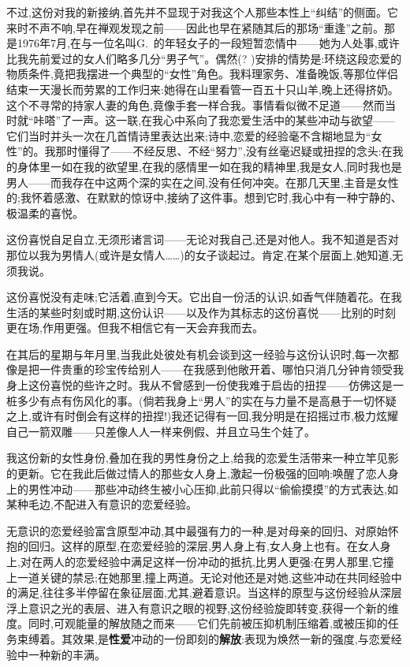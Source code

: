 不过,这份对我的新接纳,首先并不显现于对我这个人那些本性上“纠结”的侧面。它来时不声不响,早在禅观发现之前——因此也早在紧随其后的那场“重逢”之前。那是1976年7月,在与一位名叫G.~的年轻女子的一段短暂恋情中——她为人处事,或许比我先前爱过的女人们略多几分“男子气”。偶然(? )安排的情势是:环绕这段恋爱的物质条件,竟把我摆进一个典型的“女性”角色。我料理家务、\dmark{}准备晚饭,等那位伴侣结束一天漫长而劳累的工作归来:她得在山里看管一百五十只山羊,晚上还得挤奶。这个不寻常的持家人妻的角色,竟像手套一样合我。事情看似微不足道——然而当时就“咔嗒”了一声。这一联,在我心中系向了我恋爱生活中的某些冲动与欲望——它们当时并头一次在几首情诗里表达出来;诗中,恋爱的经验毫不含糊地显为“女性”的。我那时懂得了——不经反思、不经“努力”,没有丝毫迟疑或扭捏的念头:在我的身体里一如在我的欲望里,在我的感情里一如在我的精神里,我是女人,同时我也是男人——而我存在中这两个深的实在之间,没有任何冲突。在那几天里,主音是女性的;我怀着感激、在默默的惊讶中,接纳了这件事。想到它时,我心中有一种宁静的、极温柔的喜悦。

这份喜悦自足自立,无须形诸言词——无论对我自己,还是对他人。我不知道是否对那位以我为男情人(或许是女情人……)的女子谈起过。肯定,在某个层面上,她知道,无须我说。

这份喜悦没有走味;它活着,直到今天。它出自一份活的认识,如香气伴随着花。在我生活的某些时刻或时期,这份认识——以及作为其标志的这份喜悦——比别的时刻更在场,作用更强。但我不相信它有一天会弃我而去。

在其后的星期与年月里,当我此处彼处有机会谈到这一经验与这份认识时,每一次都像是把一件贵重的珍宝传给别人——在我感到他敞开着、哪怕只消几分钟肯领受我身上这份喜悦的些许之时。我从不曾感到一份使我难于启齿的扭捏——仿佛这是一桩多少有点有伤风化的事。(倘若我身上“男人”的实在与力量不是高悬于一切怀疑之上,或许有时倒会有这样的扭捏!)我还记得有一回,我分明是在招摇过市,极力炫耀自己一箭双雕——只差像人人一样来例假、并且立马生个娃了。

我这份新的女性身份,叠加在我的男性身份之上,给我的恋爱生活带来一种立竿见影的更新。它在我此后做过情人的那些女人身上,激起一份\dmark{}极强的回响:唤醒了恋人身上的男性冲动——那些冲动终生被小心压抑,此前只得以“偷偷摸摸”的方式表达,如某种毛边,不配进入有意识的恋爱经验。

无意识的恋爱经验富含原型冲动,其中最强有力的一种,是对母亲的回归、对原始怀抱的回归。这样的原型,在恋爱经验的深层,男人身上有,女人身上也有。在女人身上,对在两人的恋爱经验中满足这样一份冲动的抵抗,比男人更强:在男人那里,它撞上一道关键的禁忌;在她那里,撞上两道。无论对他还是对她,这些冲动在共同经验中的满足,往往多半停留在象征层面,尤其,避着意识。当这样的原型与这份经验从深层浮上意识之光的表层、进入有意识之眼的视野,这份经验旋即转变,获得一个新的维度。同时,可观能量的解放随之而来——它们先前被压抑机制压缩着,或被压抑的任务束缚着。其效果,是\textbf{性爱}冲动的一份即刻的\textbf{解放}:表现为焕然一新的强度,与恋爱经验中一种新的丰满。

